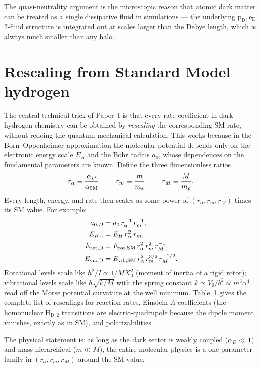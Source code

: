 \documentclass[12pt]{article}
\newcommand{\HDtwo}{\mathrm{H_{D,2}}}
\newcommand{\pD}{\mathrm{p_D}}
\newcommand{\eD}{\mathrm{e_D}}
\newcommand{\alphaD}{\alpha_D}
\newcommand{\ra}{r_\alpha}
\newcommand{\rmm}{r_m}      %
\newcommand{\rM}{r_M}
\begin{document}
The quasi-neutrality argument is the microscopic reason that atomic
dark matter can be treated as a single dissipative fluid in
simulations --- the underlying $\pD, \eD$ 2-fluid structure is
integrated out at scales larger than the Debye length, which is
always much smaller than any halo.

\section{Rescaling from Standard Model hydrogen}
\label{sec:rescaling}

The central technical trick of Paper~I is that every rate coefficient
in dark hydrogen chemistry can be obtained by \emph{rescaling} the
corresponding SM rate, without redoing the quantum-mechanical
calculation.  This works because in the Born--Oppenheimer approximation
the molecular potential depends only on the electronic energy scale
$E_H$ and the Bohr radius $a_0$, whose dependences on the fundamental
parameters are known.  Define the three dimensionless ratios
%
\begin{equation}
  \ra \equiv \frac{\alphaD}{\alpha_{\rm SM}},
  \qquad
  \rmm \equiv \frac{m}{m_e},
  \qquad
  \rM \equiv \frac{M}{m_p}.
\end{equation}
%
Every length, energy, and rate then scales as some power of $(\ra,
\rmm, \rM)$ times its SM value.  For example:
%
\begin{align}
  a_{0,D} &= a_0\,\ra^{-1}\,\rmm^{-1},
  \label{eq:aD}\\
  E_{H_D} &= E_H\,\ra^2\,\rmm,
  \label{eq:EHD}\\
  E_{\rm rot,D} &= E_{\rm rot,SM}\,\ra^2\,\rmm^2\,\rM^{-1},
  \label{eq:Erot}\\
  E_{\rm vib,D} &= E_{\rm vib,SM}\,\ra^2\,\rmm^{3/2}\,\rM^{-1/2}.
  \label{eq:Evib}
\end{align}
%
Rotational levels scale like $\hbar^2/I \propto 1/M X_0^2$ (moment of
inertia of a rigid rotor); vibrational levels scale like
$\hbar\sqrt{k/M}$ with the spring constant $k \propto V_0/b^2 \propto
m^3\alpha^4$ read off the Morse potential curvature at the well
minimum.  \citet{Ryan2022a} Table~1 gives the complete list of
rescalings for reaction rates, Einstein $A$ coefficients (the
homonuclear $\HDtwo$ transitions are electric-quadrupole because the
dipole moment vanishes, exactly as in SM), and polarizabilities.

The physical statement is: as long as the dark sector is weakly coupled
($\alphaD \ll 1$) and mass-hierarchical ($m \ll M$), the entire
molecular physics is a one-parameter family in
$(\ra, \rmm, \rM)$ around the SM value.
\end{document}

